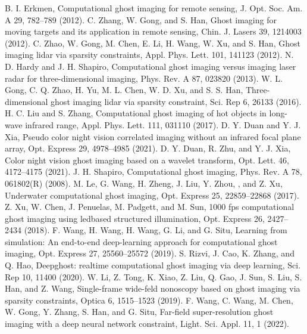 \documentclass[letterpaper,10pt]{article}
\begin{document}
\begin{thebibliography}{99}                                                                                               %

B. I. Erkmen, Computational ghost imaging for remote sensing, J. Opt. Soc. Am. A 29, 782–789 (2012).
C. Zhang, W. Gong, and S. Han, Ghost imaging for moving targets and its application in remote sensing, Chin. J. Lasers 39, 1214003 (2012).
C. Zhao, W. Gong, M. Chen, E. Li, H. Wang, W. Xu, and S. Han, Ghost imaging lidar via sparsity constraints, Appl. Phys. Lett. 101, 141123 (2012).
N. D. Hardy and J. H. Shapiro, Computational ghost imaging versus imaging laser radar for three-dimensional imaging, Phys. Rev. A 87, 023820 (2013).
W. L. Gong, C. Q. Zhao, H. Yu, M. L. Chen, W. D. Xu, and S. S. Han, Three-dimensional ghost imaging lidar via sparsity constraint, Sci. Rep 6, 26133 (2016).
H. C. Liu and S. Zhang, Computational ghost imaging of hot objects in long-wave infrared range, Appl. Phys. Lett. 111, 031110 (2017).
D. Y. Duan and Y. J. Xia, Pseudo color night vision correlated imaging without an infrared focal plane array, Opt. Express 29, 4978–4985 (2021).
D. Y. Duan, R. Zhu, and Y. J. Xia, Color night vision ghost imaging based on a wavelet transform, Opt. Lett. 46, 4172–4175 (2021).
J. H. Shapiro, Computational ghost imaging, Phys. Rev. A 78, 061802(R) (2008).
M. Le, G. Wang, H. Zheng, J. Liu, Y. Zhou, , and Z. Xu, Underwater computational ghost imaging, Opt. Express 25, 22859–22868 (2017).
Z. Xu, W. Chen, J. Penuelas, M. Padgett, and M. Sun, 1000 fps computational ghost imaging using ledbased structured illumination, Opt. Express 26, 2427–2434 (2018).
F. Wang, H. Wang, H. Wang, G. Li, and G. Situ, Learning from simulation: An end-to-end deep-learning approach for computational ghost imaging, Opt. Express 27, 25560–25572 (2019).
S. Rizvi, J. Cao, K. Zhang, and Q. Hao, Deepghost: realtime computational ghost imaging via deep learning, Sci. Rep 10, 11400 (2020).
W. Li, Z. Tong, K. Xiao, Z. Liu, Q. Gao, J. Sun, S. Liu, S. Han, and Z. Wang, Single-frame wide-feld nonoscopy based on ghost imaging via sparsity constraints, Optica 6, 1515–1523 (2019).
F. Wang, C. Wang, M. Chen, W. Gong, Y. Zhang, S. Han, and G. Situ, Far-field super-resolution ghost imaging with a deep neural network constraint, Light. Sci. Appl. 11, 1 (2022).

\end{thebibliography}
\end{document}

